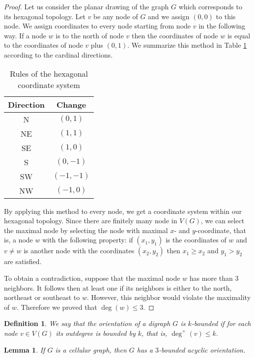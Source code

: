 \documentclass[letterpaper, 10 pt, conference]{ieeeconf}  %
\newtheorem{lem}{Lemma}
\newtheorem{defi}{Definition}
\begin{document}
\begin{proof} Let us consider the planar drawing of the graph $G$ which corresponds to its hexagonal topology.
Let $v$ be any node of $G$ and we assign $(0,0)$ to this node. We assign coordinates to every node starting from node $v$ in the following way. If a node $w$ is to the north of node $v$ then the coordinates of node $w$ is equal to the coordinates of node $v$ plus $(0,1)$. We summarize this method in Table \ref{table:assignment} according to the cardinal directions.
\begin{table}[!h]
\centering
 \begin{tabular}{||c|c||} 
 \hline
 Direction & Change  \\ [0.5ex] 
 \hline\hline
 N & $(0,1)$  \\ 
 \hline
 NE & $(1,1)$ \\
 \hline
 SE & $(1,0)$ \\
 \hline
 S & $(0,-1)$ \\
 \hline
 SW & $(-1,-1)$ \\
 \hline
 NW & $(-1,0)$ \\
 \hline
 \end{tabular}
  \caption{Rules of the hexagonal coordinate system}\label{table:assignment}
\end{table}
By applying this method to every node, we get a coordinate system within our hexagonal topology. Since there are finitely many node in $V(G)$, we can select the maximal node by selecting the node with maximal $x$- and $y$-coordinate, that is, a node $w$ with the following property: if $(x_1,y_1)$ is the coordinates of $w$ and $v \neq w$ is another node with the coordinates $(x_2,y_2)$ then $x_1 \geqslant x_2$ and $y_1 > y_2$ are satisfied.

To obtain a contradiction, suppose that the maximal node $w$ has more than 3 neighbors. It follows then at least one if its neighbors is either to the north, northeast or southeast to $w$. However, this neighbor would violate the maximality of $w$. Therefore we proved that $\deg(w) \leq 3$.
\end{proof}
\begin{defi}
We say that the orientation of a digraph $G$ is $k$\textit{-bounded} if for each node $v \in V(G)$ its outdegree is bounded by $k$, that is, $\deg^+(v) \leqslant k$.
\end{defi}
\begin{lem}\label{lem:bounded-acyclic-orientation}
If $G$ is a cellular graph, then $G$ has a $3$-bounded acyclic orientation.
\end{lem}
\end{document}
